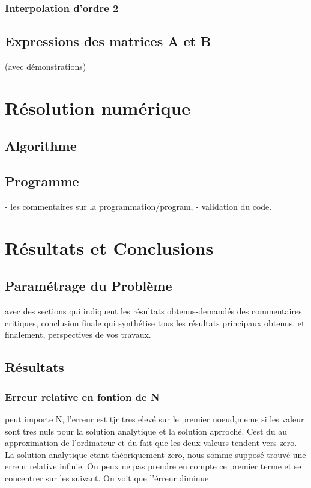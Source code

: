 \documentclass[a4paper,10pt]{report} %
\begin{document}
\subsection{Interpolation d'ordre 2}

\section{Expressions des matrices A et B }

(avec démonstrations)

\chapter{Résolution numérique} %
\section{Algorithme}
\section{Programme}
- les commentaires sur la programmation/program, 
- validation du code.


\chapter{Résultats et Conclusions}

\section{Paramétrage du Problème}
avec des sections qui indiquent les résultats obtenus-demandés 
 des commentaires critiques, conclusion
finale qui synthétise tous les résultats principaux obtenus, et finalement,
perspectives de vos travaux.

\section{Résultats}
 

\subsection{Erreur relative en fontion de N}
peut importe N, l'erreur est tjr tres elevé sur le premier noeud,meme si les valeur sont tres nuls pour la solution analytique et la solution aprroché.
Cest du au approximation de l'ordinateur et du fait que les deux valeurs tendent vers zero. La solution analytique etant théoriquement zero, nous somme supposé trouvé une erreur relative infinie. On peux ne pas prendre en compte ce premier terme et se concentrer sur les suivant. On voit que l'érreur diminue 
\end{document}
